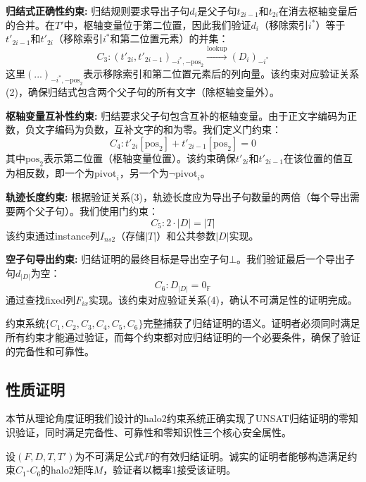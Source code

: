 \textbf{归结式正确性约束:}
归结规则要求导出子句$d_i$是父子句$t_{2i-1}$和$t_{2i}$在消去枢轴变量后的合并。在$T'$中，枢轴变量位于第二位置，因此我们验证$d_i$（移除索引$i^*$）等于$t'_{2i-1}$和$t'_{2i}$（移除索引$i^*$和第二位置元素）的并集：
$$C_3: (t'_{2i}, t'_{2i-1})_{-i^*, -\text{pos}_2} \xrightarrow{\text{lookup}} (D_i)_{-i^*}$$
这里$(...)_{-i^*, -\text{pos}_2}$表示移除索引和第二位置元素后的列向量。该约束对应验证关系(2)，确保归结式包含两个父子句的所有文字（除枢轴变量外）。

\textbf{枢轴变量互补性约束:}
归结要求父子句包含互补的枢轴变量。由于正文字编码为正数，负文字编码为负数，互补文字的和为零。我们定义门约束：
$$C_4: t'_{2i}[\text{pos}_2] + t'_{2i-1}[\text{pos}_2] = 0$$
其中$\text{pos}_2$表示第二位置（枢轴变量位置）。该约束确保$t'_{2i}$和$t'_{2i-1}$在该位置的值互为相反数，即一个为$\text{pivot}_i$，另一个为$\neg\text{pivot}_i$。

\textbf{轨迹长度约束:}
根据验证关系(3)，轨迹长度应为导出子句数量的两倍（每个导出需要两个父子句）。我们使用门约束：
$$C_5: 2 \cdot |D| = |T|$$
该约束通过instance列$I_{ns2}$（存储$|T|$）和公共参数$|D|$实现。

\textbf{空子句导出约束:}
归结证明的最终目标是导出空子句$\bot$。我们验证最后一个导出子句$d_{|D|}$为空：
$$C_6: D_{|D|} = 0_{\mathbb{F}}$$
通过查找fixed列$F_{ix}$实现。该约束对应验证关系(4)，确认不可满足性的证明完成。

约束系统$\{C_1, C_2, C_3, C_4, C_5, C_6\}$完整捕获了归结证明的语义。证明者必须同时满足所有约束才能通过验证，而每个约束都对应归结证明的一个必要条件，确保了验证的完备性和可靠性。

\subsection{性质证明}\label{sec:unsat-correctness}

本节从理论角度证明我们设计的halo2约束系统正确实现了UNSAT归结证明的零知识验证，同时满足完备性、可靠性和零知识性三个核心安全属性。

\begin{theorem}[UNSAT验证的完备性]
设$(F, D, T, T')$为不可满足公式$F$的有效归结证明。诚实的证明者能够构造满足约束$C_1$-$C_6$的halo2矩阵$M$，验证者以概率1接受该证明。
\end{theorem}

